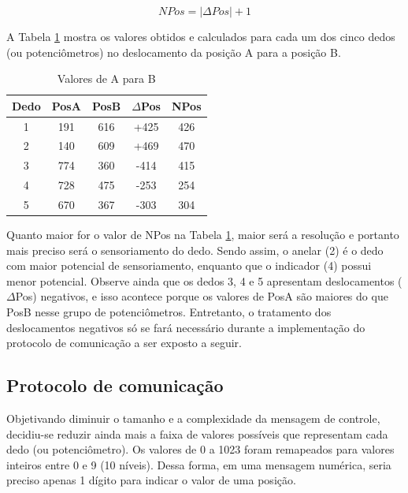 \documentclass[
	12pt,				%
	openright,			%
	oneside,			%
	a4paper,			%
	english,			%
	brazil				%
	]{abntex2}
\begin{document}
	\begin{equation}
			NPos = |\Delta Pos| + 1
		\label{Eq:NPos1}
	\end{equation}

		A Tabela \ref{Tab:deltapos} mostra os valores obtidos e calculados para cada um dos cinco dedos (ou potenciômetros) no deslocamento da posição A para a posição B.


	\begin{table}[H]
  	\centering
		\caption{Valores de A para B}
    \begin{tabular}{c|cccc}
      \midrule
			Dedo	& PosA	& PosB	& $\Delta$Pos	& NPos	\\
      \midrule
			1 		& 191 	& 616 	& 		+425 		&	426		\\
			2 		& 140 	& 609 	& 		+469 		&	470		\\
			3 		& 774 	& 360 	& 		-414 		&	415		\\
			4 		& 728 	& 475 	& 		-253 		&	254		\\
			5 		& 670 	& 367 	& 		-303 		&	304		\\      
      \midrule
    \end{tabular}
    \label{Tab:deltapos}
	\end{table}
		
		Quanto maior for o valor de NPos na Tabela \ref{Tab:deltapos}, maior será a resolução e portanto mais preciso será o sensoriamento do dedo. Sendo assim, o anelar (2) é o dedo com maior potencial de sensoriamento, enquanto que o indicador (4) possui menor potencial. Observe ainda que os dedos 3, 4 e 5 apresentam deslocamentos ($\Delta$Pos) negativos, e isso acontece porque os valores de PosA são maiores do que PosB nesse grupo de potenciômetros. Entretanto, o tratamento dos deslocamentos negativos só se fará necessário durante a implementação do protocolo de comunicação a ser exposto a seguir.


			\subsection{Protocolo de comunicação}

		Objetivando diminuir o tamanho e a complexidade da mensagem de controle, decidiu-se reduzir ainda mais a faixa de valores possíveis que representam cada dedo (ou potenciômetro). Os valores de 0 a 1023 foram remapeados para valores inteiros entre 0 e 9 (10 níveis).	Dessa forma, em uma mensagem numérica, seria preciso apenas 1 dígito para indicar o valor de uma posição. 
		
\end{document}
